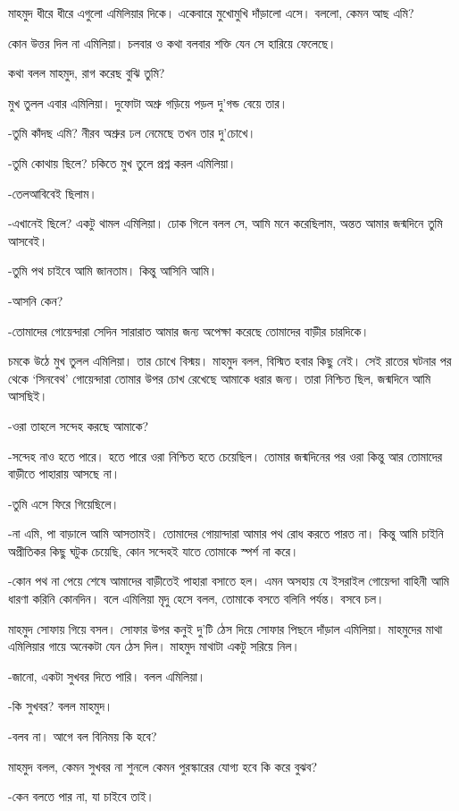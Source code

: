 \documentclass[
]{book}
\begin{document}
মাহমুদ ধীরে ধীরে এগুলো এমিলিয়ার দিকে। একেবারে মুখোমুখি দাঁড়ালো এসে। বললো, কেমন আছ এমি?

কোন উত্তর দিল না এমিলিয়া। চলবার ও কথা বলবার শক্তি যেন সে হারিয়ে ফেলেছে।

কথা বলল মাহমুদ, রাগ করেছ বুঝি তুমি?

মুখ তুলল এবার এমিলিয়া। দুফোটা অশ্রু গড়িয়ে পড়ল দু'গন্ড বেয়ে তার।

-তুমি কাঁদছ এমি? নীরব অশ্রুর ঢল নেমেছে তখন তার দু'চোখে।

-তুমি কোথায় ছিলে? চকিতে মুখ তুলে প্রশ্ন করল এমিলিয়া।

-তেলআবিবেই ছিলাম।

-এখানেই ছিলে? একটু থামল এমিলিয়া। ঢোক গিলে বলল সে, আমি মনে করেছিলাম, অন্তত আমার জন্মদিনে তুমি আসবেই।

-তুমি পথ চাইবে আমি জানতাম। কিন্তু আসিনি আমি।

-আসনি কেন?

-তোমাদের গোয়েন্দারা সেদিন সারারাত আমার জন্য অপেক্ষা করেছে তোমাদের বাড়ীর চারদিকে।

চমকে উঠে মুখ তুলল এমিলিয়া। তার চোখে বিস্ময়। মাহমুদ বলল, বিস্মিত হবার কিছু নেই। সেই রাতের ঘটনার পর থেকে `সিনবেথ' গোয়েন্দারা তোমার উপর চোখ রেখেছে আমাকে ধরার জন্য। তারা নিশ্চিত ছিল, জন্মদিনে আমি আসছিই।

-ওরা তাহলে সন্দেহ করছে আমাকে?

-সন্দেহ নাও হতে পারে। হতে পারে ওরা নিশ্চিত হতে চেয়েছিল। তোমার জন্মদিনের পর ওরা কিন্তু আর তোমাদের বাড়ীতে পাহারায় আসছে না।

-তুমি এসে ফিরে গিয়েছিলে।

-না এমি, পা বাড়ালে আমি আসতামই। তোমাদের গোয়ান্দারা আমার পথ রোধ করতে পারত না। কিন্তু আমি চাইনি অপ্রীতিকর কিছু ঘটুক চেয়েছি, কোন সন্দেহই যাতে তোমাকে স্পর্শ না করে।

-কোন পথ না পেয়ে শেষে আমাদের বাড়ীতেই পাহারা বসাতে হল। এমন অসহায় যে ইসরাইল গোয়েন্দা বাহিনী আমি ধারণা করিনি কোনদিন। বলে এমিলিয়া মৃদু হেসে বলল, তোমাকে বসতে বলিনি পর্যন্ত। বসবে চল।

মাহমুদ সোফায় গিয়ে বসল। সোফার উপর কনুই দু'টি ঠেস দিয়ে সোফার পিছনে দাঁড়াল এমিলিয়া। মাহমুদের মাথা এমিলিয়ার গায়ে অনেকটা যেন ঠেস দিল। মাহমুদ মাথাটা একটু সরিয়ে নিল।

-জানো, একটা সুখবর দিতে পারি। বলল এমিলিয়া।

-কি সুখবর? বলল মাহমুদ।

-বলব না। আগে বল বিনিময় কি হবে?

মাহমুদ বলল, কেমন সুখবর না শুনলে কেমন পুরস্কারের যোগ্য হবে কি করে বুঝব?

-কেন বলতে পার না, যা চাইবে তাই।
\end{document}
